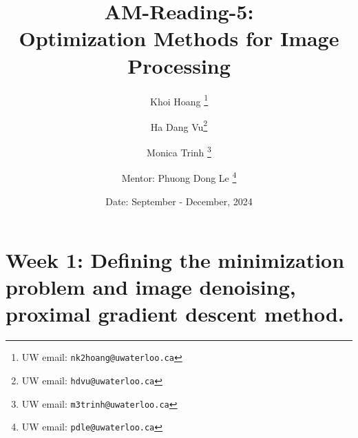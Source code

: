 \documentclass[a4paper]{article}
\begin{document}
\title{ AM-Reading-5: \\  Optimization Methods for Image Processing}

\author{Khoi Hoang %
  \thanks{UW email: \texttt{nk2hoang@uwaterloo.ca}} \and Ha Dang Vu\thanks{UW email: \texttt{hdvu@uwaterloo.ca}}   \and Monica Trinh \thanks{UW email: \texttt{m3trinh@uwaterloo.ca}} }
\affil{}

\author{Mentor: Phuong Dong Le%
  \thanks{UW email: \texttt{pdle@uwaterloo.ca}}}

\date{Date: September - December, 2024}

\maketitle
\pagebreak
\section{Week 1: Defining the minimization problem and image denoising, proximal gradient descent method.}
\end{document}
